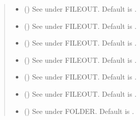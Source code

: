 \documentclass[letterpaper,10pt,english,openany]{sphinxmanual}
\begin{document}
\begin{fulllineitems}
\begin{fulllineitems}
\begin{quote}
\begin{description}
\begin{itemize}
\item {} 
 () \textendash{} See \label{\detokenize{source/sonpy:id34}}{\hyperref[\detokenize{source/users_guide:son15}]{\sphinxcrossref{{[}Son15{]}}}} under FILEOUT. Default is .

\item {} 
 () \textendash{} See \label{\detokenize{source/sonpy:id35}}{\hyperref[\detokenize{source/users_guide:son15}]{\sphinxcrossref{{[}Son15{]}}}} under FILEOUT. Default is .

\item {} 
 () \textendash{} See \label{\detokenize{source/sonpy:id36}}{\hyperref[\detokenize{source/users_guide:son15}]{\sphinxcrossref{{[}Son15{]}}}} under FILEOUT. Default is .

\item {} 
 () \textendash{} See \label{\detokenize{source/sonpy:id37}}{\hyperref[\detokenize{source/users_guide:son15}]{\sphinxcrossref{{[}Son15{]}}}} under FILEOUT. Default is .

\item {} 
 () \textendash{} See \label{\detokenize{source/sonpy:id38}}{\hyperref[\detokenize{source/users_guide:son15}]{\sphinxcrossref{{[}Son15{]}}}} under FILEOUT. Default is .

\item {} 
 () \textendash{} See \label{\detokenize{source/sonpy:id39}}{\hyperref[\detokenize{source/users_guide:son15}]{\sphinxcrossref{{[}Son15{]}}}} under FILEOUT. Default is .

\item {} 
 () \textendash{} See \label{\detokenize{source/sonpy:id40}}{\hyperref[\detokenize{source/users_guide:son15}]{\sphinxcrossref{{[}Son15{]}}}} under FOLDER. Default is .


\end{itemize}
\end{description}
\end{quote}
\end{fulllineitems}
\end{fulllineitems}
\end{document}
